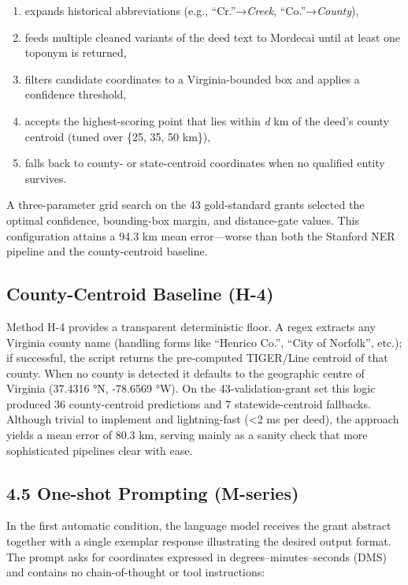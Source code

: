 \begin{enumerate}
\def\labelenumi{\arabic{enumi}.}
\tightlist
\item
  expands historical abbreviations (e.g., ``Cr.''→\emph{Creek},
  ``Co.''→\emph{County}),
\item
  feeds multiple cleaned variants of the deed text to Mordecai until at
  least one toponym is returned,
\item
  filters candidate coordinates to a Virginia-bounded box and applies a
  confidence threshold,
\item
  accepts the highest-scoring point that lies within \emph{d} km of the
  deed's county centroid (tuned over \{25, 35, 50 km\}),
\item
  falls back to county- or state-centroid coordinates when no qualified
  entity survives.
\end{enumerate}

A three-parameter grid search on the 43 gold-standard grants selected
the optimal confidence, bounding-box margin, and distance-gate values.
This configuration attains a 94.3 km mean error---worse than both the
Stanford NER pipeline and the county-centroid baseline.

\subsection{County-Centroid Baseline
(H-4)}\label{county-centroid-baseline-h-4}

Method H-4 provides a transparent deterministic floor. A regex extracts
any Virginia county name (handling forms like ``Henrico Co.'', ``City of
Norfolk'', etc.); if successful, the script returns the pre-computed
TIGER/Line centroid of that county. When no county is detected it
defaults to the geographic centre of Virginia (37.4316 °N, -78.6569 °W).
On the 43-validation-grant set this logic produced 36 county-centroid
predictions and 7 statewide-centroid fallbacks. Although trivial to
implement and lightning-fast (\textless2 ms per deed), the approach
yields a mean error of 80.3 km, serving mainly as a sanity check that
more sophisticated pipelines clear with ease.

\subsection{4.5 One-shot Prompting
(M-series)}\label{one-shot-prompting-m-series}

In the first automatic condition, the language model receives the grant
abstract together with a single exemplar response illustrating the
desired output format. The prompt asks for coordinates expressed in
degrees--minutes--seconds (DMS) and contains no chain-of-thought or tool
instructions:

